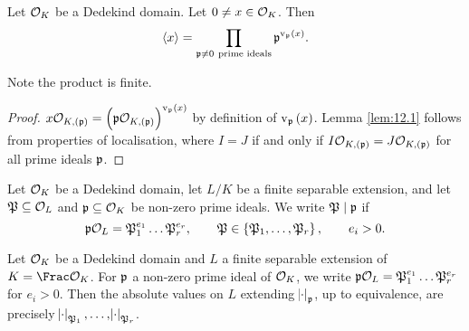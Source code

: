 
\begin{lemma}
\label{lem:12.1}
Let $ \mathcal{O}_K $ be a Dedekind domain. Let $ 0 \ne x \in \mathcal{O}_K $. Then
$$ \abr{x} = \prod_{\ppp \ne 0 \ \text{prime ideals}} \ppp^{\v_\ppp\br{x}}. $$
\end{lemma}

Note the product is finite.

\begin{proof}
$ x\OOO_{K, \br{\ppp}} = \br{\ppp\OOO_{K, \br{\ppp}}}^{\v_\ppp\br{x}} $ by definition of $ \v_\ppp\br{x} $. Lemma \ref{lem:12.1} follows from properties of localisation, where $ I = J $ if and only if $ I\OOO_{K, \br{\ppp}} = J\OOO_{K, \br{\ppp}} $ for all prime ideals $ \mathfrak{p} $.
\end{proof}

\pagebreak

\begin{notation*}
Let $ \mathcal{O}_K $ be a Dedekind domain, let $ L / K $ be a finite separable extension, and let $ \mathfrak{P} \subseteq \mathcal{O}_L $ and $ \mathfrak{p} \subseteq \mathcal{O}_K $ be non-zero prime ideals. We write $ \mathfrak{P} \mid \mathfrak{p} $ if
$$ \ppp\OOO_L = \pp_1^{e_1} \dots \pp_r^{e_r}, \qquad \pp \in \cbr{\pp_1, \dots, \pp_r}, \qquad e_i > 0. $$
\end{notation*}

\begin{theorem}
\label{thm:12.2}
Let $ \mathcal{O}_K $ be a Dedekind domain and $ L $ a finite separable extension of $ K = \Frac \OOO_K $. For $ \mathfrak{p} $ a non-zero prime ideal of $ \mathcal{O}_K $, we write $ \mathfrak{p}\mathcal{O}_L = \mathfrak{P}_1^{e_1} \dots \mathfrak{P}_r^{e_r} $ for $ e_i > 0 $. Then the absolute values on $ L $ extending $ \abs{\cdot}_{\mathfrak{p}} $, up to equivalence, are precisely $ \abs{\cdot}_{\mathfrak{P}_1}, \dots, \abs{\cdot}_{\mathfrak{P}_r} $.
\end{theorem}

